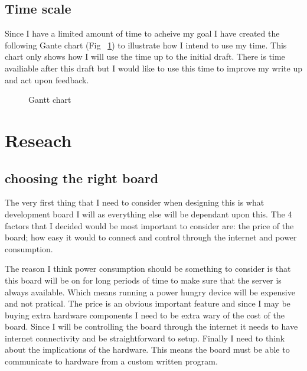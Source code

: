 \documentclass{article}
\begin{document}
\subsection{Time scale}

Since I have a limited amount of time to acheive my goal I have created the following Gante
chart (Fig ~\ref{fig:Gantt Chart}) to illustrate how I intend to use my time. This chart
only shows how I will use the time up to the initial draft. There is time availiable after
this draft but I would like to use this time to improve my write up and act upon feedback.

\begin{figure}  
    \begin{gantt}[xunitlength=\textwidth / 16]{7}{16}
        \begin{ganttitle}
        \end{ganttitle}
        \begin{ganttitle}
        \end{ganttitle}
    \end{gantt}
    \caption{Gantt chart} \label{fig:Gantt Chart}
\end{figure}  

\break
\section{Reseach}
\subsection{choosing the right board}

The very first thing that I need to consider when designing this is what development board
I will as everything else will be dependant upon this. The 4 factors that I decided would
be most important to consider are: the price of the board; how easy it would to connect
and control through the internet and power consumption. 

The reason I think power consumption should be something to consider is that this board will
be on for long periods of time to make sure that the server is always available. Which means
running a power hungry device will be expensive and not pratical. The price is an obvious
important feature and since I may be buying extra hardware components I need to be extra wary of
the cost of the board. Since I will be controlling the board through the internet it needs to
have internet connectivity and be straightforward to setup. Finally I need to think about the
implications of the hardware. This means the board must be able to communicate to hardware from
a custom written program.
\end{document}
